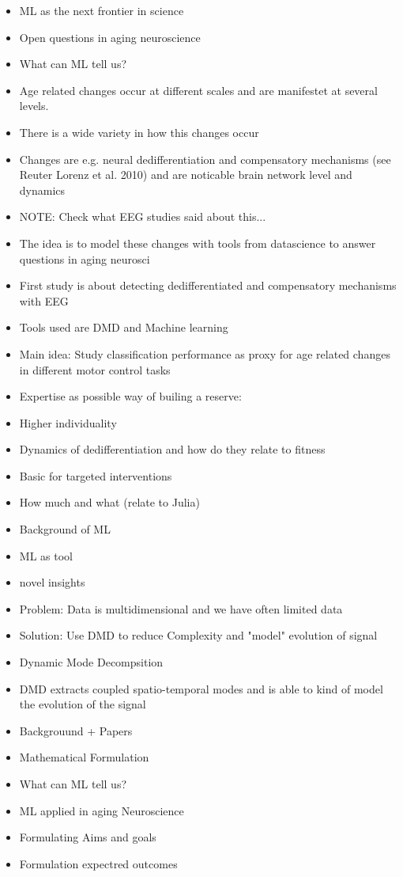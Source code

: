 \begin{itemize}
    \item ML as the next frontier in science \
    \item Open questions in aging neuroscience 
    \item What can ML tell us? 
\end{itemize}

\begin{itemize}
    \item Age related changes occur at different scales and are manifestet at several levels.
    \item There is a wide variety in how this changes occur
    \item Changes are e.g. neural dedifferentiation and compensatory mechanisms (see Reuter Lorenz et al. 2010) and are noticable brain network level and dynamics
    \item NOTE: Check what EEG studies said about this...
    \item The idea is to model these changes with tools from datascience to answer questions in aging neurosci
    \item First study is about detecting dedifferentiated and compensatory mechanisms with EEG
    \item Tools used are DMD and Machine learning
    \item Main idea: Study classification performance as proxy for age related changes in different motor control tasks
    \item Expertise as possible way of builing a reserve:
    \item Higher individuality 
    \item Dynamics of dedifferentiation and how do they relate to fitness
    \item Basic for targeted interventions 
    \item How much and what (relate to Julia)
    \item Background of ML
    \item ML as tool 
    \item novel insights 
    \item Problem: Data is multidimensional and we have often limited data 
    \item Solution: Use DMD to reduce Complexity and "model" evolution of signal 
    \item Dynamic Mode Decompsition
    \item DMD extracts coupled spatio-temporal modes and is able to kind of model the evolution of the signal 
    \item Backgrouund + Papers 
    \item Mathematical Formulation
    \item What can ML tell us?
    \item ML applied in aging Neuroscience
    \item Formulating Aims and goals 
    \item Formulation expectred outcomes
\end{itemize}